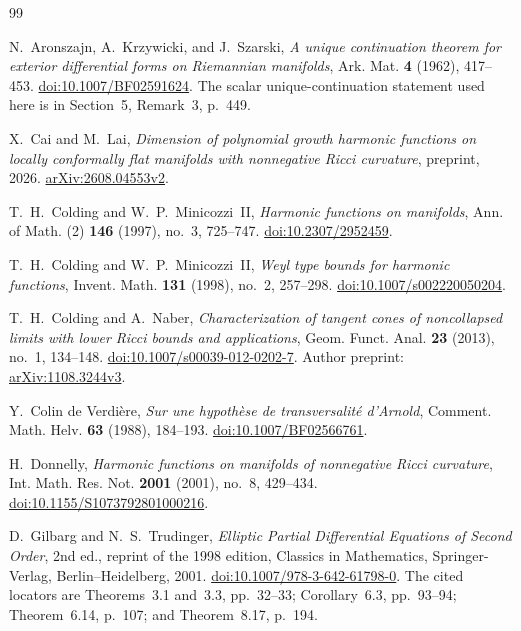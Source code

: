 \begin{thebibliography}{99}

N.~Aronszajn, A.~Krzywicki, and J.~Szarski,
\emph{A unique continuation theorem for exterior differential forms on
Riemannian manifolds},
Ark. Mat. \textbf{4} (1962), 417--453.
\href{https://doi.org/10.1007/BF02591624}{doi:10.1007/BF02591624}.
The scalar unique-continuation statement used here is in Section~5,
Remark~3, p.~449.

X.~Cai and M.~Lai,
\emph{Dimension of polynomial growth harmonic functions on locally
conformally flat manifolds with nonnegative Ricci curvature},
preprint, 2026.
\href{https://arxiv.org/abs/2608.04553v2}{arXiv:2608.04553v2}.

T.~H.~Colding and W.~P.~Minicozzi~II,
\emph{Harmonic functions on manifolds},
Ann. of Math. (2) \textbf{146} (1997), no.~3, 725--747.
\href{https://doi.org/10.2307/2952459}{doi:10.2307/2952459}.

T.~H.~Colding and W.~P.~Minicozzi~II,
\emph{Weyl type bounds for harmonic functions},
Invent. Math. \textbf{131} (1998), no.~2, 257--298.
\href{https://doi.org/10.1007/s002220050204}{doi:10.1007/s002220050204}.

T.~H.~Colding and A.~Naber,
\emph{Characterization of tangent cones of noncollapsed limits with lower
Ricci bounds and applications},
Geom. Funct. Anal. \textbf{23} (2013), no.~1, 134--148.
\href{https://doi.org/10.1007/s00039-012-0202-7}{doi:10.1007/s00039-012-0202-7}.
Author preprint: \href{https://arxiv.org/abs/1108.3244v3}{arXiv:1108.3244v3}.

Y.~Colin de Verdi\`ere,
\emph{Sur une hypoth\`ese de transversalit\'e d'Arnold},
Comment. Math. Helv. \textbf{63} (1988), 184--193.
\href{https://doi.org/10.1007/BF02566761}{doi:10.1007/BF02566761}.

H.~Donnelly,
\emph{Harmonic functions on manifolds of nonnegative Ricci curvature},
Int. Math. Res. Not. \textbf{2001} (2001), no.~8, 429--434.
\href{https://doi.org/10.1155/S1073792801000216}{doi:10.1155/S1073792801000216}.

D.~Gilbarg and N.~S.~Trudinger,
\emph{Elliptic Partial Differential Equations of Second Order},
2nd ed., reprint of the 1998 edition, Classics in Mathematics,
Springer-Verlag, Berlin--Heidelberg, 2001.
\href{https://doi.org/10.1007/978-3-642-61798-0}{doi:10.1007/978-3-642-61798-0}.
The cited locators are Theorems~3.1 and~3.3, pp.~32--33;
Corollary~6.3, pp.~93--94; Theorem~6.14, p.~107; and
Theorem~8.17, p.~194.


\end{thebibliography}
